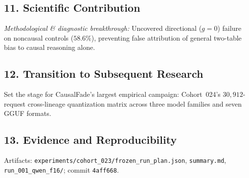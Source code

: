 \subsection*{11. Scientific Contribution}
\emph{Methodological \& diagnostic breakthrough:} Uncovered directional ($g=0$) failure on noncausal controls ($58.6\%$), preventing false attribution of general two-table bias to causal reasoning alone.

\subsection*{12. Transition to Subsequent Research}
Set the stage for CausalFade's largest empirical campaign: Cohort~024's $30{,}912$-request cross-lineage quantization matrix across three model families and seven GGUF formats.

\subsection*{13. Evidence and Reproducibility}
Artifacts: \texttt{experiments/cohort\_023/frozen\_run\_plan.json}, \texttt{summary.md}, \texttt{run\_001\_qwen\_f16/}; commit \texttt{4aff668}.
